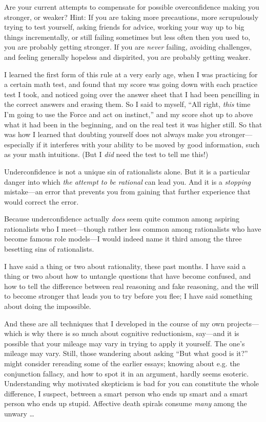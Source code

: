 {
 Are your current attempts to compensate for possible
overconfidence making you stronger, or weaker? Hint: If you are taking
more precautions, more scrupulously trying to test yourself, asking
friends for advice, working your way up to big things incrementally, or
still failing sometimes but less often then you used to, you are
probably getting stronger. If you are \textit{never} failing, avoiding
challenges, and feeling generally hopeless and dispirited, you are
probably getting weaker.}

{
 I learned the first form of this rule at a very early age, when I
was practicing for a certain math test, and found that my score was
going down with each practice test I took, and noticed going over the
answer sheet that I had been pencilling in the correct answers and
erasing them. So I said to myself, ``All right,
\textit{this} time I'm going to use the Force and act
on instinct,'' and my score shot up to above what it
had been in the beginning, and on the real test it was higher still. So
that was how I learned that doubting yourself does not always make you
stronger---especially if it interferes with your ability to be moved by
good information, such as your math intuitions. (But I \textit{did}
need the test to tell me this!)}

{
 Underconfidence is not a unique sin of rationalists alone. But it
is a particular danger into which \textit{the attempt to be rational}
can lead you. And it is a \textit{stopping} mistake---an error that
prevents you from gaining that further experience that would correct
the error.}

{
 Because underconfidence actually \textit{does} seem quite common
among aspiring rationalists who I meet---though rather less common
among rationalists who have become famous role models---I would indeed
name it third among the three besetting sins of rationalists.}

\myendsectiontext


{
 I have said a thing or two about rationality, these past months. I
have said a thing or two about how to untangle questions that have
become confused, and how to tell the difference between real reasoning
and fake reasoning, and the will to become stronger that leads you to
try before you flee; I have said something about doing the impossible.
}

{
 And these are all techniques that I developed in the course of my
own projects---which is why there is so much about cognitive
reductionism, say---and it is possible that your mileage may vary in
trying to apply it yourself. The one's mileage may
vary. Still, those wandering about asking ``But what
good is it?'' might consider rereading some of the
earlier essays; knowing about e.g. the conjunction fallacy, and how to
spot it in an argument, hardly seems esoteric. Understanding why
motivated skepticism is bad for you can constitute the whole
difference, I suspect, between a smart person who ends up smart and a
smart person who ends up stupid. Affective death spirals consume
\textit{many} among the unwary \ldots}

